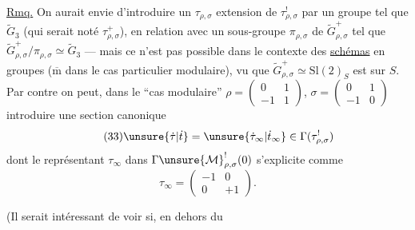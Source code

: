 \uline{Rmq.} On aurait envie d'introduire un $\tau_{\rho,\sigma}$ extension  de $\tau_{\rho,\sigma}^{!}$ par un groupe tel que $\widetilde G_3$ (qui serait noté $\tau_{\rho,\sigma}^{+}$), en relation avec un sous-groupe $\pi_{\rho,\sigma}$ de $\widetilde G_{\rho,\sigma}^{+}$  tel que $\widetilde G_{\rho,\sigma}^{+}/\pi_{\rho,\sigma}\simeq\widetilde G_3$ --- mais ce n'est pas possible dans le contexte des \uline{schémas} en groupes ($\overline{\mathrm m}$ dans le cas particulier modulaire), vu que $\widetilde G_{\rho,\sigma}^{+}\simeq\mathrm{Sl}(2)_S$ est   sur $S$. Par contre on peut, dans le ``cas modulaire'' $\rho=\begin{pmatrix}0&1\\-1&1\end{pmatrix}$, $\sigma=\begin{pmatrix}0&1\\-1&0\end{pmatrix}$ introduire une section canonique
\[
\tag{33}
\unsure{\dot\tau|\dot t}=\unsure{\dot\tau_\infty|\dot t_\infty}\in\Gamma(\tau_{\rho,\sigma}^{!})
\]
dont le représentant $\tau_\infty$ dans $\Gamma\unsure{\mathcal M}_{\rho,\sigma}^{!}(0)$ s'explicite comme
\[
\tag{34}
\tau_\infty=\begin{pmatrix}-1&0\\0&+1\end{pmatrix}.
\]

(Il serait intéressant de voir si, en dehors du


